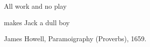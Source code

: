 
\epigraph{
	All work and no play 
	
	makes Jack a dull boy
}{
		James Howell, Paramoigraphy (Proverbs), 1659.
}